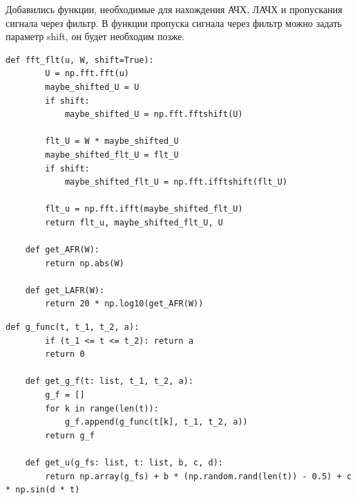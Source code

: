 \documentclass[a4paper, 12pt]{article}
\begin{document}
    Добавились функции, необходимые для нахождения АЧХ, ЛАЧХ и пропускания сигнала через фильтр.
    В функции пропуска сигнала через фильтр можно задать параметр shift, он будет необходим позже.
    \begin{lstlisting}[label=c22, caption={Программа для нахождения АЧХ, ЛАЧХ и пропуска сигнала через фильтр}]
    def fft_flt(u, W, shift=True):
        U = np.fft.fft(u)
        maybe_shifted_U = U
        if shift:
            maybe_shifted_U = np.fft.fftshift(U)
    
        flt_U = W * maybe_shifted_U
        maybe_shifted_flt_U = flt_U
        if shift:
            maybe_shifted_flt_U = np.fft.ifftshift(flt_U)
    
        flt_u = np.fft.ifft(maybe_shifted_flt_U)
        return flt_u, maybe_shifted_flt_U, U
    
    def get_AFR(W):
        return np.abs(W)
    
    def get_LAFR(W):
        return 20 * np.log10(get_AFR(W))
    \end{lstlisting}

    
    \begin{lstlisting}[label=help, caption={Программа для создания исходной функции и сигнала с шумом}]
    def g_func(t, t_1, t_2, a):
        if (t_1 <= t <= t_2): return a
        return 0
    
    def get_g_f(t: list, t_1, t_2, a):
        g_f = []
        for k in range(len(t)):
            g_f.append(g_func(t[k], t_1, t_2, a))
        return g_f
    
    def get_u(g_fs: list, t: list, b, c, d):
        return np.array(g_fs) + b * (np.random.rand(len(t)) - 0.5) + c * np.sin(d * t)
    \end{lstlisting}
\end{document}
